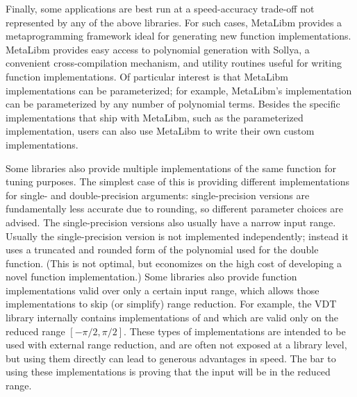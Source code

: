 \documentclass[paper.tex]{subfiles}
\begin{document}
Finally, some applications are best run
  at a speed-accuracy trade-off not represented
  by any of the above libraries.
For such cases, MetaLibm provides a metaprogramming framework
  ideal for generating new function implementations.
MetaLibm provides easy access to polynomial generation with Sollya,
  a convenient cross-compilation mechanism,
  and utility routines useful for writing function implementations.
Of particular interest is that MetaLibm implementations
  can be parameterized;
  for example, MetaLibm's  implementation
  can be parameterized by any number of polynomial terms.
Besides the specific implementations that ship with MetaLibm,
  such as the parameterized  implementation,
  users can also use MetaLibm to write their own custom implementations.

Some libraries also provide multiple implementations of the same function
  for tuning purposes.
The simplest case of this is providing different implementations
  for single- and double-precision arguments:
  single-precision versions are fundamentally less accurate due to rounding,
  so different parameter choices are advised.
The single-precision versions also usually have a narrow input range.
Usually the single-precision version is not implemented independently;
  instead it uses a truncated and rounded form
  of the polynomial used for the double function.
(This is not optimal, but economizes on the high cost
  of developing a novel function implementation.)
Some libraries also provide function implementations
  valid over only a certain input range,
  which allows those implementations to skip (or simplify) range reduction.
For example, the VDT library internally
  contains implementations of  and  which are valid
  only on the reduced range $[-\pi/2, \pi/2]$.
These types of implementations are intended to be used with external range
  reduction, and are often not exposed at a library level, but using them
  directly can lead to generous advantages in speed.
The bar to using these implementations
  is proving that the input will be in the reduced range.

\end{document}
